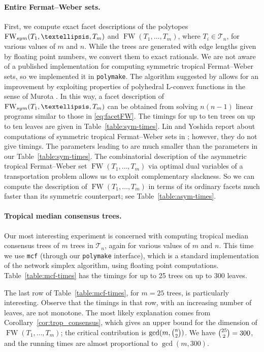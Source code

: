 \documentclass[a4paper,12pt]{amsart}
\newcommand\cT{{\mathcal T}}
\DeclareMathOperator{\FW}{FW} %
\newcommand{\FWsym}{\FW_{\rm sym}} %
\theoremstyle{remark}
\newcommand\polymake{\texttt{polymake}\xspace}
\newcommand\mcf{\texttt{mcf}\xspace}
\begin{document}
\paragraph{Entire Fermat--Weber sets.}
First, we compute exact facet descriptions of the polytopes $\FWsym(T_1,\dots,T_m)$ and $\FW(T_1,\dots,T_m)$, where $T_i\in\cT_n$, for various values of $m$ and $n$.
While the trees are generated with edge lengths given by floating point numbers, we convert them to exact rationals.
We are not aware of a published implementation for computing symmetric tropical Fermat--Weber sets, so we implemented it in \polymake.
The algorithm suggested by \cite[Proposition 26]{ConvTreeSp} allows for an improvement by exploiting properties of polyhedral L-convex functions in the sense of Murota \cite[]{Murota:2003}.
In this way, a facet description of $\FWsym(T_1,\dots,T_m)$ can be obtained from solving $n(n-1)$ linear programs similar to those in \eqref{eq:facetFW}.
The timings for up to ten trees on up to ten leaves are given in Table~\ref{table:sym-times}.
Lin and Yoshida report about computations of symmetric tropical Fermat--Weber sets in \cite[\S4]{Lin-Yoshida:2018}; however, they do not give timings.
The parameters leading to \cite[Table~1]{Lin-Yoshida:2018} are much smaller than the parameters in our Table~\ref{table:sym-times}.
The combinatorial description of the asymmetric tropical Fermat--Weber set $\FW(T_1,\dots,T_m)$ via optimal dual variables of a transportation problem allows us to exploit complementary slackness.
So we can compute the description of $\FW(T_1,\dots,T_m)$ in terms of its ordinary facets much faster than its symmetric counterpart; see Table~\ref{table:asym-times}.

\paragraph{Tropical median consensus trees.}
Our most interesting experiment is concerned with computing tropical median consensus trees of $m$ trees in $\cT_n$, again for various values of $m$ and $n$.
This time we use \mcf \cite{mcf} (through our \polymake interface), which is a standard implementation of the network simplex algorithm, using floating point computations.
Table~\ref{table:mcf-times} has the timings for up to 25 trees on up to 300 leaves.

The last row of Table~\ref{table:mcf-times}, for $m=25$ trees, is particularly interesting.
Observe that the timings in that row, with an increasing number of leaves, are not monotone.
The most likely explanation comes from Corollary~\ref{cor:trop_consensus}, which gives an upper bound for the dimension of $\FW(T_1,\dots,T_m)$; the critical contribution is $\gcd(m,\tbinom{n}{2})$.
We have $\tbinom{25}{2}=300$, and the running times are almost proportional to $\gcd(m,300)$.
\end{document}
